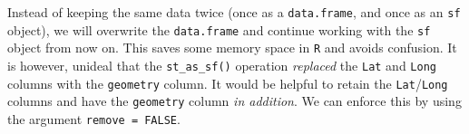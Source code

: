 \documentclass[]{book}
\newenvironment{Shaded}{\begin{snugshade}}{\end{snugshade}}
\newcommand{\DecValTok}[1]{\textcolor[rgb]{0.00,0.00,0.81}{{#1}}}
\newcommand{\StringTok}[1]{\textcolor[rgb]{0.31,0.60,0.02}{{#1}}}
\newcommand{\CommentTok}[1]{\textcolor[rgb]{0.56,0.35,0.01}{\textit{{#1}}}}
\newcommand{\NormalTok}[1]{{#1}}
\theoremstyle{definition}
\theoremstyle{definition}
\theoremstyle{definition}
\theoremstyle{remark}
\begin{document}
\begin{Shaded}
\end{Shaded}

Instead of keeping the same data twice (once as a \texttt{data.frame},
and once as an \texttt{sf} object), we will overwrite the
\texttt{data.frame} and continue working with the \texttt{sf} object
from now on. This saves some memory space in \texttt{R} and avoids
confusion. It is however, unideal that the \texttt{st\_as\_sf()}
operation \emph{replaced} the \texttt{Lat} and \texttt{Long} columns
with the \texttt{geometry} column. It would be helpful to retain the
\texttt{Lat}/\texttt{Long} columns and have the \texttt{geometry} column
\emph{in addition}. We can enforce this by using the argument
\texttt{remove\ =\ FALSE}.
\end{document}
